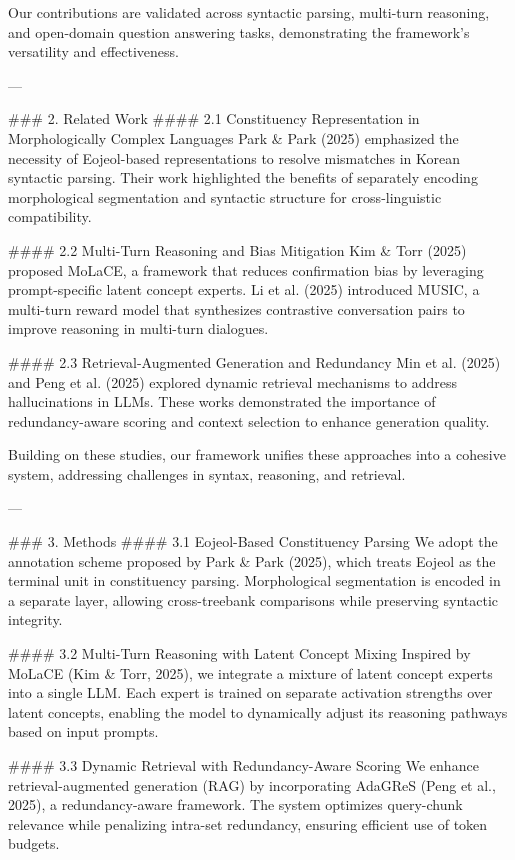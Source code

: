 Our contributions are validated across syntactic parsing, multi-turn reasoning, and open-domain question answering tasks, demonstrating the framework's versatility and effectiveness.

---

### 2. Related Work  
#### 2.1 Constituency Representation in Morphologically Complex Languages  
Park & Park (2025) emphasized the necessity of Eojeol-based representations to resolve mismatches in Korean syntactic parsing. Their work highlighted the benefits of separately encoding morphological segmentation and syntactic structure for cross-linguistic compatibility.

#### 2.2 Multi-Turn Reasoning and Bias Mitigation  
Kim & Torr (2025) proposed MoLaCE, a framework that reduces confirmation bias by leveraging prompt-specific latent concept experts. Li et al. (2025) introduced MUSIC, a multi-turn reward model that synthesizes contrastive conversation pairs to improve reasoning in multi-turn dialogues.

#### 2.3 Retrieval-Augmented Generation and Redundancy  
Min et al. (2025) and Peng et al. (2025) explored dynamic retrieval mechanisms to address hallucinations in LLMs. These works demonstrated the importance of redundancy-aware scoring and context selection to enhance generation quality.  

Building on these studies, our framework unifies these approaches into a cohesive system, addressing challenges in syntax, reasoning, and retrieval.

---

### 3. Methods  
#### 3.1 Eojeol-Based Constituency Parsing  
We adopt the annotation scheme proposed by Park & Park (2025), which treats Eojeol as the terminal unit in constituency parsing. Morphological segmentation is encoded in a separate layer, allowing cross-treebank comparisons while preserving syntactic integrity.

#### 3.2 Multi-Turn Reasoning with Latent Concept Mixing  
Inspired by MoLaCE (Kim & Torr, 2025), we integrate a mixture of latent concept experts into a single LLM. Each expert is trained on separate activation strengths over latent concepts, enabling the model to dynamically adjust its reasoning pathways based on input prompts.

#### 3.3 Dynamic Retrieval with Redundancy-Aware Scoring  
We enhance retrieval-augmented generation (RAG) by incorporating AdaGReS (Peng et al., 2025), a redundancy-aware framework. The system optimizes query-chunk relevance while penalizing intra-set redundancy, ensuring efficient use of token budgets.

